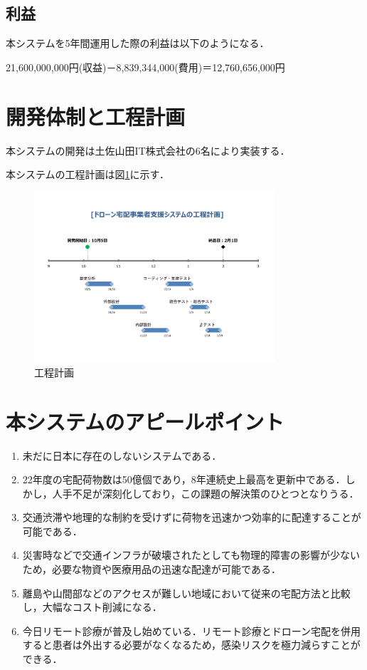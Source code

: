 \documentclass[a4paper, titlepage]{jsarticle}
\begin{document}
\subsection{利益}
本システムを5年間運用した際の利益は以下のようになる．
\begin{center}
  21,600,000,000円(収益)－8,839,344,000(費用)＝12,760,656,000円
\end{center}

\section{開発体制と工程計画}
本システムの開発は土佐山田IT株式会社の6名により実装する．

本システムの工程計画は図\ref{fig:schedule}に示す．
\begin{figure}[htbp]
  \label{fig:schedule}
  \centering
  \includegraphics[width=0.8\textwidth]{schedule.pdf}
  \caption{工程計画}
\end{figure}

\section{本システムのアピールポイント}
\begin{enumerate}
  \item 未だに日本に存在のしないシステムである．
  \item 22年度の宅配荷物数は50億個であり，8年連続史上最高を更新中である．しかし，人手不足が深刻化しており，この課題の解決策のひとつとなりうる．
  \item 交通渋滞や地理的な制約を受けずに荷物を迅速かつ効率的に配達することが可能である．
  \item 災害時などで交通インフラが破壊されたとしても物理的障害の影響が少ないため，必要な物資や医療用品の迅速な配達が可能である．
  \item 離島や山間部などのアクセスが難しい地域において従来の宅配方法と比較し，大幅なコスト削減になる．
  \item 今日リモート診療が普及し始めている．リモート診療とドローン宅配を併用すると患者は外出する必要がなくなるため，感染リスクを極力減らすことができる．
\end{enumerate}
\end{document}
